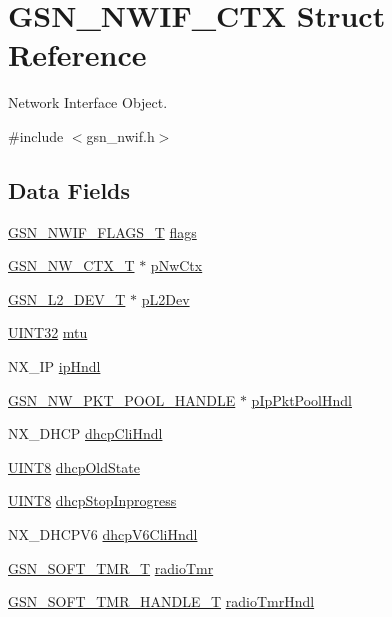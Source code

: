 \hypertarget{a00167}{
\section{GSN\_\-NWIF\_\-CTX Struct Reference}
\label{a00167}
}


Network Interface Object.  




{\ttfamily \#include $<$gsn\_\-nwif.h$>$}

\subsection*{Data Fields}
\begin{DoxyCompactItemize}
\item 
\hyperlink{a00670_ga2c209f2b9b6b2b6b0b2e1132acd45891}{GSN\_\-NWIF\_\-FLAGS\_\-T} \hyperlink{a00167_a4767d0f6570f98849cacbfa9a18ab612}{flags}
\item 
\hyperlink{a00164}{GSN\_\-NW\_\-CTX\_\-T} $\ast$ \hyperlink{a00167_a4ab8e1b7273bd13fb04f9726ebf1d430}{pNwCtx}
\item 
\hyperlink{a00107}{GSN\_\-L2\_\-DEV\_\-T} $\ast$ \hyperlink{a00167_a26c032e68793c08c6f4c3509dee1e4f2}{pL2Dev}
\item 
\hyperlink{a00660_gae1e6edbbc26d6fbc71a90190d0266018}{UINT32} \hyperlink{a00167_a29e099f0875d30b6a75ee68c747dde11}{mtu}
\item 
NX\_\-IP \hyperlink{a00167_a930e1578ead182fd8ff6cd8f8540a54c}{ipHndl}
\item 
\hyperlink{a00532_afccc5835aa5e2916600678de68186848}{GSN\_\-NW\_\-PKT\_\-POOL\_\-HANDLE} $\ast$ \hyperlink{a00167_a4cdcdc7a80f5e9b124e3cdff24cdcaec}{pIpPktPoolHndl}
\item 
NX\_\-DHCP \hyperlink{a00167_aa0614deafcee66a6a87c2685279c82dc}{dhcpCliHndl}
\item 
\hyperlink{a00660_gab27e9918b538ce9d8ca692479b375b6a}{UINT8} \hyperlink{a00167_add3b061cbe3f42dca486ad19787820da}{dhcpOldState}
\item 
\hyperlink{a00660_gab27e9918b538ce9d8ca692479b375b6a}{UINT8} \hyperlink{a00167_a5e26015109e86651492607313559e708}{dhcpStopInprogress}
\item 
NX\_\-DHCPV6 \hyperlink{a00167_a82dbaba55c4ecc53e2da16b84515851d}{dhcpV6CliHndl}
\item 
\hyperlink{a00229}{GSN\_\-SOFT\_\-TMR\_\-T} \hyperlink{a00167_a0e030509c91ba81863d5adfca4820654}{radioTmr}
\item 
\hyperlink{a00229}{GSN\_\-SOFT\_\-TMR\_\-HANDLE\_\-T} \hyperlink{a00167_af2cb244344f575f7e8a429889b11a496}{radioTmrHndl}

\end{DoxyCompactItemize}
